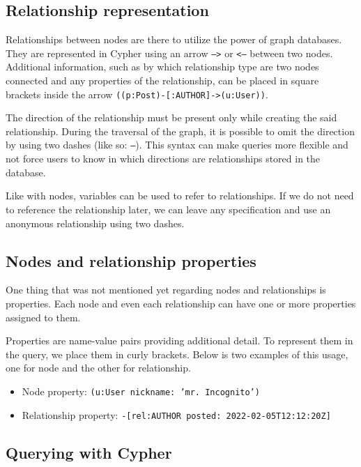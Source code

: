 \subsection{Relationship representation}

Relationships between nodes are there to utilize the power of graph databases. They are represented in Cypher using an arrow \texttt{-->}
or \texttt{<--} between two nodes. Additional information, such as by which relationship type are two nodes connected and any properties of the relationship, can be placed in square brackets inside the arrow \texttt{((p:Post)-[:AUTHOR]->(u:User))}. \cite{noauthor_getting_nodate}

The direction of the relationship must be present only while creating the said relationship.
During the traversal of the graph, it is possible to omit the direction by using two dashes (like so: \texttt{--}).
This syntax can make queries more flexible and not force users to know in which directions are relationships stored in the database.

Like with nodes, variables can be used to refer to relationships. If we do not need to reference the relationship later,
we can leave any specification and use an anonymous relationship using two dashes.

\subsection{Nodes and relationship properties}

One thing that was not mentioned yet regarding nodes and relationships is properties. Each node and even each relationship can have one or more properties assigned to them.

Properties are name-value pairs providing additional detail. To represent them in the query, we place them in curly brackets. \cite{noauthor_getting_nodate}
Below is two examples of this usage, one for node and the other for relationship.

\begin{itemize}
    \item {Node property: \texttt{(u:User {nickname: 'mr. Incognito'})}}
    \item {Relationship property: \texttt{-[rel:AUTHOR {posted: 2022-02-05T12:12:20Z}]}}
\end{itemize}

\subsection{Querying with Cypher}


